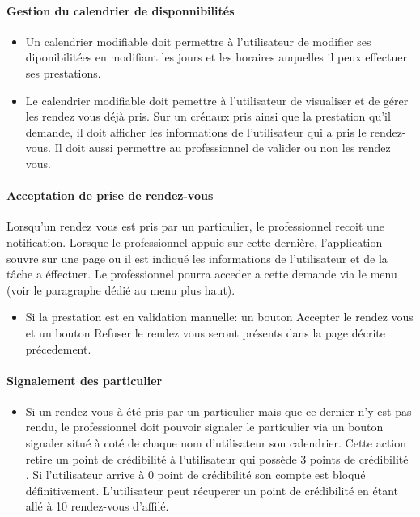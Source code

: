 \documentclass{article}
\begin{document}
\paragraph{Gestion du calendrier de disponnibilités}
\begin{itemize}
\item Un calendrier modifiable doit permettre à l'utilisateur de
  modifier ses diponibilitées en modifiant les jours et les horaires
  auquelles il peux effectuer ses prestations.
\item Le calendrier modifiable doit pemettre à l'utilisateur de
  visualiser et de gérer les rendez vous déjà pris. Sur un crénaux
  pris ainsi que la prestation qu'il demande, il doit afficher les informations de l'utilisateur qui a pris
  le rendez-vous. Il doit aussi permettre au professionnel de valider
  ou non les rendez vous.
\end{itemize}
\paragraph{Acceptation de prise de rendez-vous}


Lorsqu'un rendez vous est pris par un particulier, le
  professionnel recoit une notification. Lorsque le professionnel
  appuie sur cette dernière, l'application souvre sur une page ou il
  est indiqué les informations de l'utilisateur et de la tâche a éffectuer.
  Le professionnel pourra acceder a cette demande via le menu (voir le paragraphe dédié au menu plus haut).
\begin{itemize}
\item  Si la prestation est en validation manuelle: un bouton \og
  Accepter le rendez vous \fg{} et un bouton \og
  Refuser le rendez vous \fg{} seront présents dans la page décrite précedement.
\end{itemize}
\paragraph{Signalement des particulier}
\begin{itemize}
\item Si un rendez-vous à été pris par un particulier mais que ce dernier
  n'y est pas rendu, le professionnel doit pouvoir
  signaler le particulier via un bouton \og signaler \fg{} situé
  à coté de chaque nom d'utilisateur son calendrier. Cette action retire un \og point de crédibilité \fg{} à l'utilisateur qui possède
  3 \og points de crédibilité \fg{}. Si l'utilisateur arrive à 0 point de crédibilité son compte est
  bloqué définitivement. L'utilisateur peut récuperer un point de crédibilité  en étant
  allé à 10 rendez-vous d'affilé.
\end{itemize}
\end{document}
